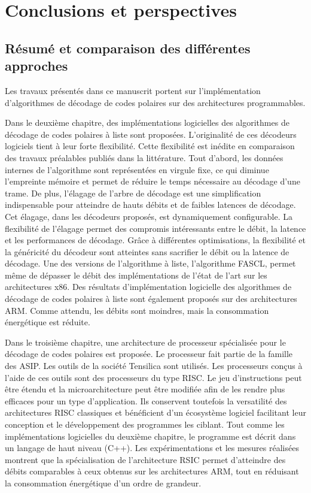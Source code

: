 \chapter*{Conclusions et perspectives}

\section*{Résumé et comparaison des différentes approches}

Les travaux présentés dans ce manuscrit portent sur l'implémentation d'algorithmes de décodage de codes polaires sur des architectures programmables.

Dans le deuxième chapitre, des implémentations logicielles des algorithmes de décodage de codes polaires à liste sont proposées. L'originalité de ces décodeurs logiciels tient à leur forte flexibilité. Cette flexibilité est inédite en comparaison des travaux préalables publiés dans la littérature. Tout d'abord, les données internes de l'algorithme sont représentées en virgule fixe, ce qui diminue l'empreinte mémoire et permet de réduire le temps nécessaire au décodage d'une trame. De plus, l'élagage de l'arbre de décodage est une simplification indispensable pour atteindre de hauts débits et de faibles latences de décodage. Cet élagage, dans les décodeurs proposés, est dynamiquement configurable. La flexibilité de l'élagage permet des compromis intéressants entre le débit, la latence et les performances de décodage. Grâce à différentes optimisations, la flexibilité et la généricité du décodeur sont atteintes sans sacrifier le débit ou la latence de décodage. Une des versions de l'algorithme à liste, l'algorithme FASCL, permet même de dépasser le débit des implémentations de l'état de l'art sur les architectures x86. Des résultats d'implémentation logicielle des algorithmes de décodage de codes polaires à liste sont également proposés sur des architectures ARM. Comme attendu, les débits sont moindres, mais la consommation énergétique est réduite.

Dans le troisième chapitre, une architecture de processeur spécialisée pour le décodage de codes polaires est proposée. Le processeur fait partie de la famille des ASIP. Les outils de la société Tensilica sont utilisés. Les processeurs conçus à l'aide de ces outils sont des processeurs du type RISC. Le jeu d'instructions peut être étendu et la microarchitecture peut être modifiée afin de les rendre plus efficaces pour un type d'application. Ils conservent toutefois la versatilité des architectures RISC classiques et bénéficient d'un écosystème logiciel facilitant leur conception et le développement des programmes les ciblant. Tout comme les implémentations logicielles du deuxième chapitre, le programme est décrit dans un langage de haut niveau (C++). Les expérimentations et les mesures réalisées montrent que la spécialisation de l'architecture RSIC permet d'atteindre des débits comparables à ceux obtenus sur les architectures ARM, tout en réduisant la consommation énergétique d'un ordre de grandeur.

